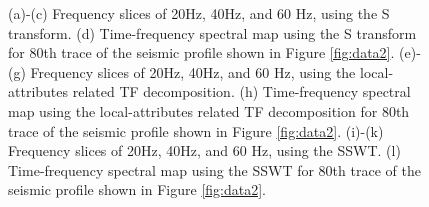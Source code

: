 \begin{figure}[htb!]
  \centering

	\caption{(a)-(c) Frequency slices of 20Hz, 40Hz, and 60 Hz, using the S transform. (d) Time-frequency spectral map using the S transform for 80th trace of the seismic profile shown in Figure \ref{fig:data2}. (e)-(g) Frequency slices of 20Hz, 40Hz, and 60 Hz, using the local-attributes related TF decomposition. (h) Time-frequency spectral map using the local-attributes related TF decomposition for 80th trace of the seismic profile shown in Figure \ref{fig:data2}.  (i)-(k) Frequency slices of 20Hz, 40Hz, and 60 Hz, using the SSWT. (l) Time-frequency spectral map using the SSWT for 80th trace of the seismic profile shown in Figure \ref{fig:data2}. }
   \label{fig:s1-0,s2-0,s3-0,tf-s,l1-0,l2-0,l3-0,tf-l,ss1-0,ss2-0,ss3-0,tf-ss}
\end{figure}










